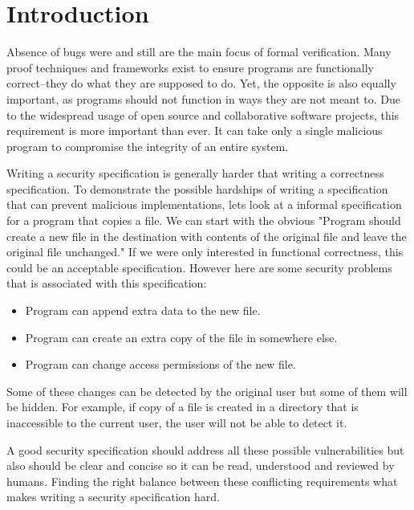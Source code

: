 
\section{Introduction}

Absence of bugs were and still are the main focus of formal verification. Many proof techniques and frameworks exist to ensure programs are functionally correct–they do what they are supposed to do. Yet, the opposite is also equally important, as programs should not function in ways they are not meant to. Due to the widespread usage of open source and collaborative software projects, this requirement is more important than ever. It can take only a single malicious program to compromise the integrity of an entire system. 


Writing a security specification is generally harder that writing a correctness specification. To demonstrate the possible hardships of writing a specification that can prevent malicious implementations, lets look at a informal specification for a program that copies a file. We can start with the obvious "Program should create a new file in the destination with contents of the original file and leave the original file unchanged." If we were only interested in functional correctness, this could be an acceptable specification. However here are some security problems that is associated with this specification:

\begin{itemize}
	\item Program can append extra data to the new file.
	\item Program can create an extra copy of the file in somewhere else.
	\item Program can change access permissions of the new file.
\end{itemize}

Some of these changes can be detected by the original user but some of them will be hidden. For example, if copy of a file is created in a directory that is inaccessible to the current user, the user will not be able to detect it. 

A good security specification should address all these possible vulnerabilities but also should be clear and concise so it can be read, understood and reviewed by humans. Finding the right balance between these conflicting requirements what makes writing a security specification hard.

